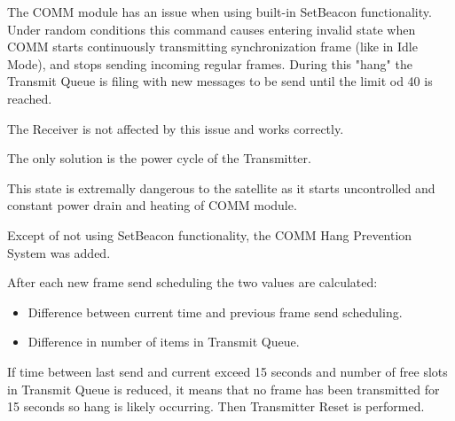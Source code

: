
The COMM module has an issue when using built-in SetBeacon functionality.
Under random conditions this command causes entering invalid state when COMM starts continuously transmitting synchronization frame (like in Idle Mode), and stops sending incoming regular frames.
During this "hang" the Transmit Queue is filing with new messages to be send until the limit od 40 is reached.

The Receiver is not affected by this issue and works correctly.

The only solution is the power cycle of the Transmitter.

This state is extremally dangerous to the satellite as it starts uncontrolled and constant power drain and heating of COMM module. 

Except of not using SetBeacon functionality, the COMM Hang Prevention System was added.

After each new frame send scheduling the two values are calculated:
\begin{itemize}
\item Difference between current time and previous frame send scheduling.
\item Difference in number of items in Transmit Queue. 
\end{itemize}

If time between last send and current exceed 15 seconds and number of free slots in Transmit Queue is reduced, it means that no frame has been transmitted for 15 seconds so hang is likely occurring.
Then Transmitter Reset is performed.
